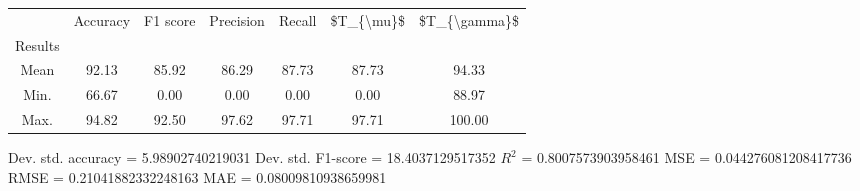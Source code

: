 \begin{tabular}{|c|c|c|c|c|c|c|}
\toprule
{} &  Accuracy &  F1 score &  Precision &  Recall &  \$T\_\{\textbackslash mu\}\$ &  \$T\_\{\textbackslash gamma\}\$ \\
Results &           &           &            &         &            &               \\
\hline
Mean    &     92.13 &     85.92 &      86.29 &   87.73 &      87.73 &         94.33 \\
Min.    &     66.67 &      0.00 &       0.00 &    0.00 &       0.00 &         88.97 \\
Max.    &     94.82 &     92.50 &      97.62 &   97.71 &      97.71 &        100.00 \\
\bottomrule
\end{tabular}

 Dev. std. accuracy = 5.98902740219031
 Dev. std. F1-score = 18.4037129517352
 $R^2$ = 0.8007573903958461
 MSE = 0.044276081208417736
 RMSE = 0.21041882332248163
 MAE = 0.08009810938659981